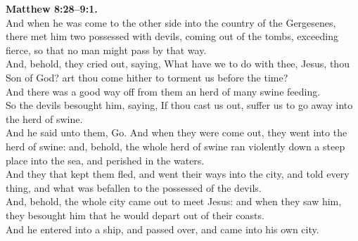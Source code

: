 \documentclass[10pt]{article} %
\begin{document}
{\begin{minipage}[t]{0.45\textwidth}
\textbf{Matthew 8:28--9:1.}\\
And when he was come to the other side into the country of the Gergesenes, there met him two possessed with devils, coming out of the tombs, exceeding fierce, so that no man might pass by that way.\\
And, behold, they cried out, saying, What have we to do with thee, Jesus, thou Son of God? art thou come hither to torment us before the time?\\
And there was a good way off from them an herd of many swine feeding.\\
So the devils besought him, saying, If thou cast us out, suffer us to go away into the herd of swine.\\
And he said unto them, Go. And when they were come out, they went into the herd of swine: and, behold, the whole herd of swine ran violently down a steep place into the sea, and perished in the waters.\\
And they that kept them fled, and went their ways into the city, and told every thing, and what was befallen to the possessed of the devils.\\
And, behold, the whole city came out to meet Jesus: and when they saw him, they besought him that he would depart out of their coasts.\\
And he entered into a ship, and passed over, and came into his own city.\\

\end{minipage}}
\vspace*{\fill}
\newpage
\Huge%
\vspace*{\fill}
\begin{spacing}{1.3}
\end{spacing}
\vspace*{\fill}
\end{document}

